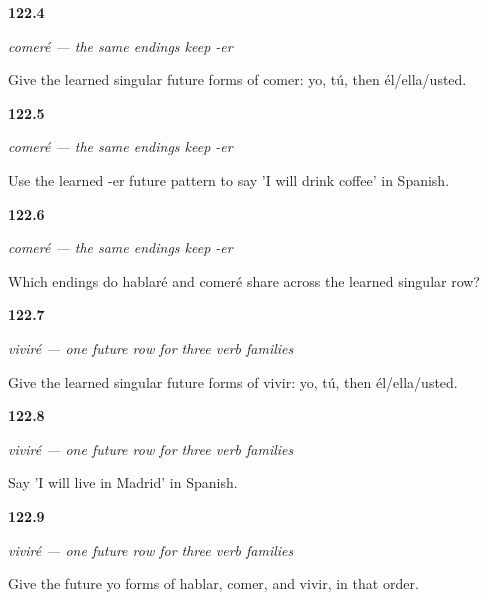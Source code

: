 \noindent\begin{minipage}[t]{\linewidth}
\raggedright
\hypertarget{review-ES-C17-comer-futuro-singular-forms}{\textbf{122.4}} \emph{comeré — the same endings keep -er}\par
\small Give the learned singular future forms of comer: yo, tú, then él/ella/usted.
\end{minipage}\par\medskip

\noindent\begin{minipage}[t]{\linewidth}
\raggedright
\hypertarget{review-ES-C17-comer-futuro-cafe}{\textbf{122.5}} \emph{comeré — the same endings keep -er}\par
\small Use the learned -er future pattern to say 'I will drink coffee' in Spanish.
\end{minipage}\par\medskip

\noindent\begin{minipage}[t]{\linewidth}
\raggedright
\hypertarget{review-ES-C17-comer-futuro-shared-endings}{\textbf{122.6}} \emph{comeré — the same endings keep -er}\par
\small Which endings do hablaré and comeré share across the learned singular row?
\end{minipage}\par\medskip

\noindent\begin{minipage}[t]{\linewidth}
\raggedright
\hypertarget{review-ES-C17-vivir-futuro-singular-forms}{\textbf{122.7}} \emph{viviré — one future row for three verb families}\par
\small Give the learned singular future forms of vivir: yo, tú, then él/ella/usted.
\end{minipage}\par\medskip

\noindent\begin{minipage}[t]{\linewidth}
\raggedright
\hypertarget{review-ES-C17-vivir-futuro-madrid}{\textbf{122.8}} \emph{viviré — one future row for three verb families}\par
\small Say 'I will live in Madrid' in Spanish.
\end{minipage}\par\medskip

\noindent\begin{minipage}[t]{\linewidth}
\raggedright
\hypertarget{review-ES-C17-vivir-futuro-three-yo}{\textbf{122.9}} \emph{viviré — one future row for three verb families}\par
\small Give the future yo forms of hablar, comer, and vivir, in that order.
\end{minipage}\par\medskip

